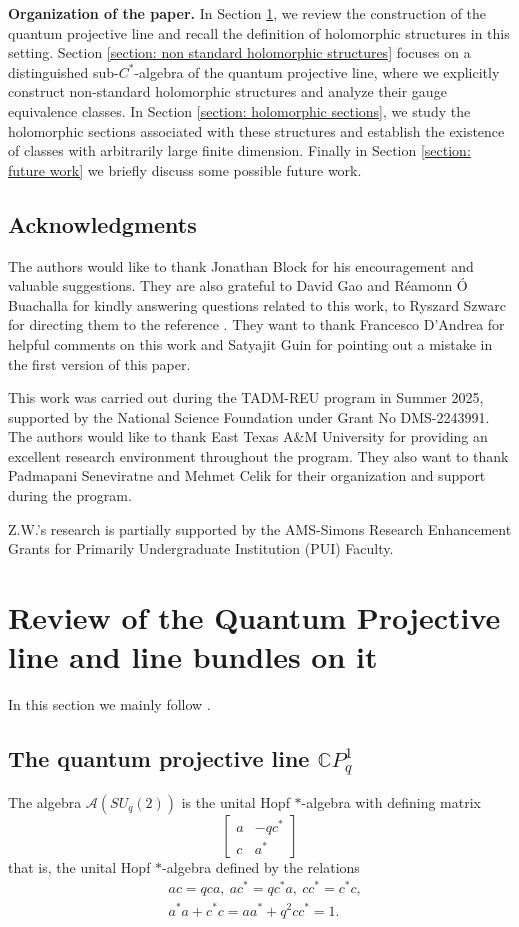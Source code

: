 \documentclass[12pt]{article}
\numberwithin{equation}{section}
\def\C{{\mathbb C}}
\def\A{\mathcal{A}}
\newcommand{\bb}[1]{\begin{bmatrix}#1\end{bmatrix}}
\begin{document}
\medskip
\noindent
\textbf{Organization of the paper.}  
In Section \ref{section: review of quanum line}, we review the construction of the quantum projective line and recall the definition of holomorphic structures in this setting. Section \ref{section: non standard holomorphic structures} focuses on a distinguished sub-$C^*$-algebra of the quantum projective line, where we explicitly construct non-standard holomorphic structures and analyze their gauge equivalence classes. In Section \ref{section: holomorphic sections}, we study the holomorphic sections associated with these structures and establish the existence of classes with arbitrarily large finite dimension. Finally in Section \ref{section: future work} we briefly discuss some possible future work.

\subsection*{Acknowledgments}
The authors would like to thank Jonathan Block for his encouragement and valuable suggestions. They are also grateful to David Gao and R\'{e}amonn \'{O} Buachalla for kindly answering questions related to this work,  to Ryszard Szwarc for directing them to the reference \cite{koekoek2010hypergeometric}.  They want to thank Francesco D'Andrea for helpful comments on this work and   Satyajit Guin for pointing out a mistake in the first version of this paper.

This work was carried out during the TADM-REU program in Summer 2025, supported by the National
Science Foundation under Grant No DMS-2243991. The authors would like to thank East Texas A\&M University for providing an excellent research environment throughout the program. They also want to thank  Padmapani Seneviratne and Mehmet Celik for their organization and support during the program.

Z.W.'s research is partially supported by the AMS-Simons Research Enhancement Grants for Primarily Undergraduate Institution (PUI) Faculty.

\section{Review of the Quantum Projective line and line bundles on it}\label{section: review of quanum line}
In this section we mainly follow \cite[Section 3.1]{khalkhali2011holomorphic}.

\subsection{The quantum projective line  $\C P^1_q$}\label{subsection: quantum projective line}
The algebra $\A(SU_q(2))$ is the unital Hopf $*$-algebra with defining matrix \[
\bb{a & -qc^* \\ c & a^*}
\]
that is, the unital Hopf $*$-algebra defined by the relations 
\begin{equation}\label{eq: relations in A(SUq(2))}
    \begin{split}
    &ac=qca,~ac^*=qc^*a,~cc^*=c^*c,\\
    & a^*a+c^*c=aa^*+q^2cc^*=1.
    \end{split}
\end{equation}
\end{document}
